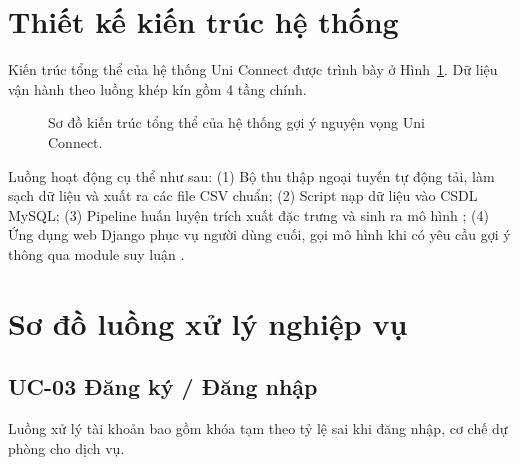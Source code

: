 \section{Thiết kế kiến trúc hệ thống}

Kiến trúc tổng thể của hệ thống Uni Connect được trình bày ở Hình~\ref{fig:kientruc}. Dữ liệu vận hành theo luồng khép kín gồm 4 tầng chính.

\begin{figure}[H]
\centering
{}
\caption{Sơ đồ kiến trúc tổng thể của hệ thống gợi ý nguyện vọng Uni Connect.}
\label{fig:kientruc}
\end{figure}

Luồng hoạt động cụ thể như sau: (1) Bộ thu thập ngoại tuyến  tự động tải, làm sạch dữ liệu và xuất ra các file CSV chuẩn; (2) Script  nạp dữ liệu vào CSDL MySQL; (3) Pipeline huấn luyện  trích xuất đặc trưng và  sinh ra mô hình ; (4) Ứng dụng web Django phục vụ người dùng cuối, gọi mô hình khi có yêu cầu gợi ý thông qua module suy luận .

\section{Sơ đồ luồng xử lý nghiệp vụ}

\subsection{UC-03 Đăng ký / Đăng nhập}

Luồng xử lý tài khoản bao gồm khóa tạm theo tỷ lệ sai khi đăng nhập, cơ chế dự phòng cho dịch vụ.

